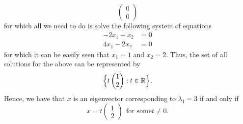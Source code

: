 \begin{eg}
\[\begin{pmatrix}
                                                                   0 \\
                                                                   0
                                                                  \end{pmatrix} \]
            for which all we need to do is solve the following system of equations
            \begin{align*}
                {-2x}_{1} + {x}_{2} &= 0  \\
                {4x}_{1} - {2x}_{2} &= 0 
            \end{align*}
            for which it can be easily seen that \( {x}_{1} = 1  \) and \( {x}_{2} = 2  \). Thus, the set of all solutions for the above can be represented by
            \[  \Big\{ t \begin{pmatrix} 
                       1 \\
                       2 
                      \end{pmatrix} : t \in \mathbb{R} \Big\}. \]
        Hence, we have that \( x  \) is an eigenvector corresponding to \( {\lambda}_{1} = 3  \) if and only if
        \[  x = t \begin{pmatrix} 
                   1 \\
                   2 
               \end{pmatrix} \ \ \text{for some} t \neq 0. \]
\end{eg}



